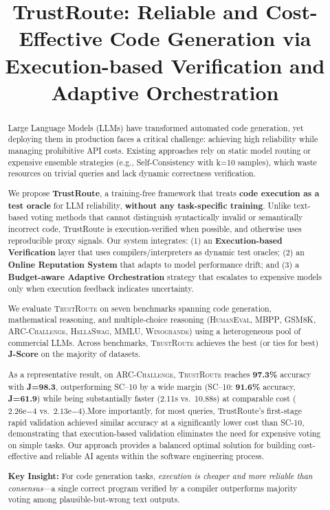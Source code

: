\documentclass[acmsmall,screen,review,anonymous]{acmart}
\begin{document}
\title{TrustRoute: Reliable and Cost-Effective Code Generation via Execution-based Verification and Adaptive Orchestration}

\begin{abstract}
Large Language Models (LLMs) have transformed automated code generation, yet deploying them in production faces a critical challenge: achieving high reliability while managing prohibitive API costs. Existing approaches rely on static model routing or expensive ensemble strategies (e.g., Self-Consistency with k=10 samples), which waste resources on trivial queries and lack dynamic correctness verification.

We propose \textbf{TrustRoute}, a training-free framework that treats \textbf{code execution as a test oracle} for LLM reliability, \textbf{without any task-specific training}. Unlike text-based voting methods that cannot distinguish syntactically invalid or semantically incorrect code, TrustRoute is execution-verified when possible, and otherwise uses reproducible proxy signals. Our system integrates: (1) an \textbf{Execution-based Verification} layer that uses compilers/interpreters as dynamic test oracles; (2) an \textbf{Online Reputation System} that adapts to model performance drift; and (3) a \textbf{Budget-aware Adaptive Orchestration} strategy that escalates to expensive models only when execution feedback indicates uncertainty.

We evaluate \textsc{TrustRoute} on seven benchmarks spanning code generation, mathematical reasoning, and multiple-choice reasoning
(\textsc{HumanEval}, \textsc{MBPP}, \textsc{GSM8K}, \textsc{ARC-Challenge}, \textsc{HellaSwag}, \textsc{MMLU}, \textsc{Winogrande})
using a heterogeneous pool of commercial LLMs. Across benchmarks, \textsc{TrustRoute} achieves the best (or ties for best) \textbf{J-Score} on the majority of datasets.

As a representative result, on \textsc{ARC-Challenge}, \textsc{TrustRoute} reaches \textbf{97.3\%} accuracy with \textbf{J=98.3},
outperforming SC--10 by a wide margin (SC--10: \textbf{91.6\%} accuracy, \textbf{J=61.9}) while being substantially faster
(2.11s vs.\ 10.88s) at comparable cost ($2.26\mathrm{e}{-4}$ vs.\ $2.13\mathrm{e}{-4}$).More importantly, for most queries, TrustRoute's first-stage rapid validation achieved similar accuracy at a significantly lower cost than SC-10, demonstrating that execution-based validation eliminates the need for expensive voting on simple tasks. Our approach provides a balanced optimal solution for building cost-effective and reliable AI agents within the software engineering process.

\textbf{Key Insight:} For code generation tasks, \textit{execution is cheaper and more reliable than consensus}—a single correct program verified by a compiler outperforms majority voting among plausible-but-wrong text outputs.
\end{abstract}
\end{document}
